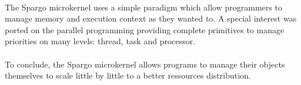 \documentclass[10pt,a4wide]{article}
\begin{document}
\begin{multicols}{2}
\paragraph{}

The Spargo microkernel uses a simple paradigm which allow programmers to
manage memory and execution context as they wanted to. A special interest
was ported on the parallel programming providing complete primitives to
manage priorities on many levels: thread, task and processor.

\paragraph{}

To conclude, the Spargo microkernel allows programs to manage their objects
themselves to scale little by little to a better ressources distribution.

\end{multicols}
\end{document}
